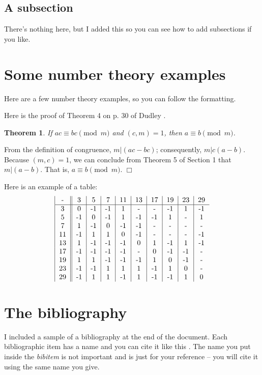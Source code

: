 \documentclass[12pt, leqno]{article}
\newenvironment{proof}{\noindent {\bf Proof:}}{$\Box$ \vspace{2 ex}}
\newtheorem{theorem}[proposition]{Theorem}
\begin{document}
\subsection{A subsection}
There's nothing here, but I added this so you can see how to add subsections if you like.

\section{Some number theory examples}

Here are a few number theory examples, so you can follow the formatting.

Here is the proof of Theorem 4 on p. 30 of Dudley \cite{D}.
\begin{theorem} 
If $ac \equiv bc \pmod{m}$ and $(c, m) = 1$, then $a \equiv b \pmod{m}$.
\end{theorem}

\begin{proof}
From the definition of congruence, $m | (ac - bc)$; consequently, $m | c(a - b)$. Because $(m, c) = 1$, we can conclude from Theorem 5 of
Section 1 that $m | (a - b)$. That is, $a \equiv b \pmod{m}$.
\end{proof}

Here is an example of a table:
\[ 
\begin{tabular}{|c||c|c|c|c|c|c|c|c|c}
 - & 3 & 5 & 7 & 11 & 13 & 17 & 19 & 23 & 29 \\ 
 \hline 3 & 0 & -1 & -1 & 1 & - & - & -1 & 1 & -1 \\ 
 5 & -1 & 0 & -1 & 1 & -1 & -1 & 1 & - & 1 \\ 
 7 & 1 & -1 & 0 & -1 & -1 & - & - & - & - \\ 
 11 & -1 & 1 & 1 & 0 & -1 & - & - & - & -1 \\ 
 13 & 1 & -1 & -1 & -1 & 0 & 1 & -1 & 1 & -1 \\ 
 17 & -1 & -1 & -1 & -1 & - & 0 & -1 & -1 & - \\ 
 19 & 1 & 1 & -1 & -1 & -1 & 1 & 0 & -1 & - \\ 
 23 & -1 & -1 & 1 & 1 & 1 & -1 & 1 & 0 & - \\ 
 29 & -1 & 1 & 1 & -1 & 1 & -1 & -1 & 1 & 0 
 \end{tabular} 
 \]


\section{The bibliography}
I included a sample of a bibliography at the end of the document. Each bibliographic item has a name and you can cite it like this
\cite{D}. The name you put inside the {\itshape bibitem} is not important and is just for your reference -- you will cite it using the same name you give.
\end{document}
